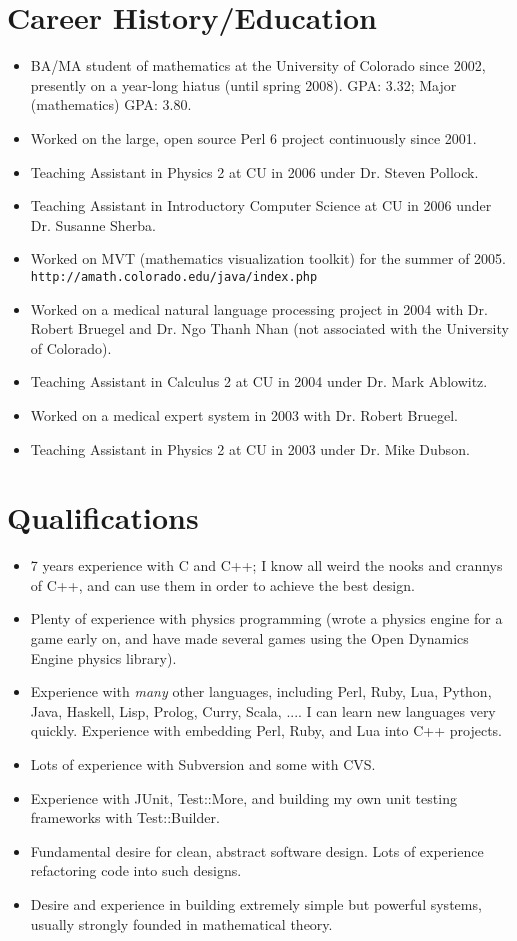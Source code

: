 \documentclass[12pt]{article}
\begin{document}
\section*{Career History/Education}

\begin{itemize}
\item BA/MA student of mathematics at the University of Colorado since
2002, presently on a year-long hiatus (until spring 2008).  GPA: 3.32;
Major (mathematics) GPA: 3.80.
\item Worked on the large, open source Perl 6 project continuously since
2001.
\item Teaching Assistant in Physics 2 at CU in 2006 under Dr. Steven
Pollock.
\item Teaching Assistant in Introductory Computer Science at CU in 2006
under Dr. Susanne Sherba.
\item Worked on MVT (mathematics visualization toolkit) for the summer
of 2005. \verb|http://amath.colorado.edu/java/index.php|
\item Worked on a medical natural language processing project in 2004 with
Dr. Robert Bruegel and Dr. Ngo Thanh Nhan (not associated with the
University of Colorado).
\item Teaching Assistant in Calculus 2 at CU in 2004 under Dr. Mark
Ablowitz.
\item Worked on a medical expert system in 2003 with Dr. Robert Bruegel.
\item Teaching Assistant in Physics 2 at CU in 2003 under Dr. Mike
Dubson.
\end{itemize}

\section*{Qualifications}

\begin{itemize}
\item 7 years experience with C and C++; I know all weird the nooks and
crannys of C++, and can use them in order to achieve the best design.
\item Plenty of experience with physics programming (wrote a physics
engine for a game early on, and have made several games using the Open
Dynamics Engine physics library).
\item Experience with \textit{many} other languages, including Perl,
Ruby, Lua, Python, Java, Haskell, Lisp, Prolog, Curry, Scala, ....  I
can learn new languages very quickly.  Experience with embedding Perl,
Ruby, and Lua into C++ projects. 
\item Lots of experience with Subversion and some with CVS.
\item Experience with JUnit, Test::More, and building my own unit
testing frameworks with Test::Builder.
\item Fundamental desire for clean, abstract software design.  Lots of
experience refactoring code into such designs.
\item Desire and experience in building extremely simple but powerful
systems, usually strongly founded in mathematical theory.
\end{itemize}
\end{document}
